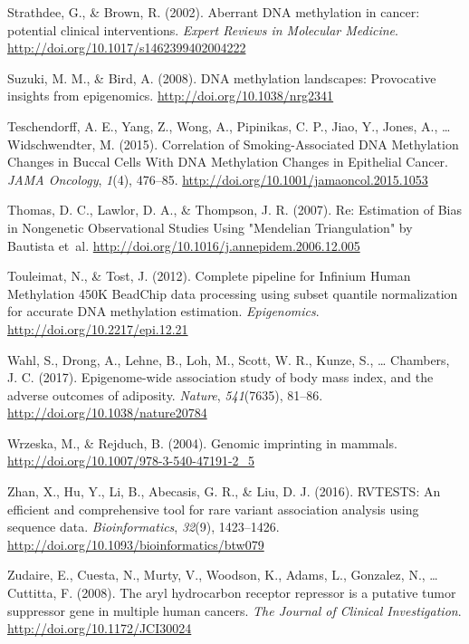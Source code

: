 \documentclass[11pt,twoside]{bristolthesis}
\newlength{\cslhangindent}
\newenvironment{cslreferences}%
  {\setlength{\parindent}{0pt}%
  \everypar{\setlength{\hangindent}{\cslhangindent}}\ignorespaces}%
  {\par}
\begin{document}
\begin{cslreferences}
\leavevmode\hypertarget{ref-Strathdee2002}{}%
Strathdee, G., \& Brown, R. (2002). Aberrant DNA methylation in cancer: potential clinical interventions. \emph{Expert Reviews in Molecular Medicine}. \url{http://doi.org/10.1017/s1462399402004222}

\leavevmode\hypertarget{ref-Suzuki2008}{}%
Suzuki, M. M., \& Bird, A. (2008). DNA methylation landscapes: Provocative insights from epigenomics. \url{http://doi.org/10.1038/nrg2341}

\leavevmode\hypertarget{ref-Teschendorff2015}{}%
Teschendorff, A. E., Yang, Z., Wong, A., Pipinikas, C. P., Jiao, Y., Jones, A., \ldots{} Widschwendter, M. (2015). Correlation of Smoking-Associated DNA Methylation Changes in Buccal Cells With DNA Methylation Changes in Epithelial Cancer. \emph{JAMA Oncology}, \emph{1}(4), 476--85. \url{http://doi.org/10.1001/jamaoncol.2015.1053}

\leavevmode\hypertarget{ref-Thomas2007}{}%
Thomas, D. C., Lawlor, D. A., \& Thompson, J. R. (2007). Re: Estimation of Bias in Nongenetic Observational Studies Using "Mendelian Triangulation" by Bautista et~al. \url{http://doi.org/10.1016/j.annepidem.2006.12.005}

\leavevmode\hypertarget{ref-Touleimat2012}{}%
Touleimat, N., \& Tost, J. (2012). Complete pipeline for Infinium Human Methylation 450K BeadChip data processing using subset quantile normalization for accurate DNA methylation estimation. \emph{Epigenomics}. \url{http://doi.org/10.2217/epi.12.21}

\leavevmode\hypertarget{ref-Wahl2017}{}%
Wahl, S., Drong, A., Lehne, B., Loh, M., Scott, W. R., Kunze, S., \ldots{} Chambers, J. C. (2017). Epigenome-wide association study of body mass index, and the adverse outcomes of adiposity. \emph{Nature}, \emph{541}(7635), 81--86. \url{http://doi.org/10.1038/nature20784}

\leavevmode\hypertarget{ref-Wrzeska2004}{}%
Wrzeska, M., \& Rejduch, B. (2004). Genomic imprinting in mammals. \url{http://doi.org/10.1007/978-3-540-47191-2_5}

\leavevmode\hypertarget{ref-Zhan2016}{}%
Zhan, X., Hu, Y., Li, B., Abecasis, G. R., \& Liu, D. J. (2016). RVTESTS: An efficient and comprehensive tool for rare variant association analysis using sequence data. \emph{Bioinformatics}, \emph{32}(9), 1423--1426. \url{http://doi.org/10.1093/bioinformatics/btw079}

\leavevmode\hypertarget{ref-Zudaire2008}{}%
Zudaire, E., Cuesta, N., Murty, V., Woodson, K., Adams, L., Gonzalez, N., \ldots{} Cuttitta, F. (2008). The aryl hydrocarbon receptor repressor is a putative tumor suppressor gene in multiple human cancers. \emph{The Journal of Clinical Investigation}. \url{http://doi.org/10.1172/JCI30024}
\end{cslreferences}
\end{document}
